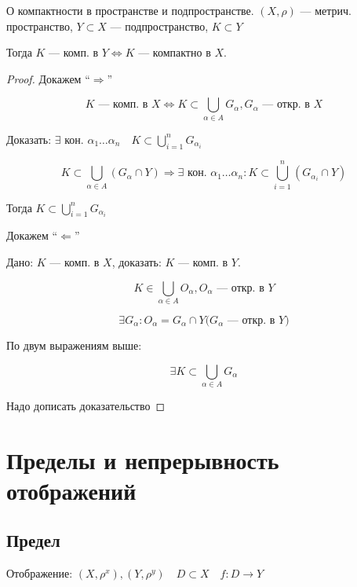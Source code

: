 \begin{theorem}
    О компактности в пространстве и подпространстве.
    $(X,\rho)$ --- метрич. пространство, $Y\subset X$ --- подпространство, $K\subset Y$

    Тогда $K$ --- комп. в $Y \Leftrightarrow K$ --- компактно в $X$.
\end{theorem}

\begin{proof}
    Докажем ``$\Rightarrow$''

    $$K\text{ --- комп. в }X \Leftrightarrow K\subset\bigcup\limits_{\alpha\in A} G_\alpha, G_\alpha\text{ --- откр. в } X$$

    Доказать: $\exists$ кон. $\alpha_1\ldots\alpha_n \quad K\subset\bigcup\limits_{i=1}^n G_{\alpha_i}$

    $$K\subset\bigcup\limits_{\alpha\in A}(G_\alpha\cap Y) \Rightarrow \exists\text{ кон. } \alpha_1\ldots\alpha_n: K\subset \bigcup\limits_{i=1}^n(G_{\alpha_i}\cap Y)$$

    Тогда $K\subset \bigcup\limits_{i=1}^n G_{\alpha_i}$

    Докажем ``$\Leftarrow$''

    Дано: $K$ --- комп. в $X$, доказать: $K$ --- комп. в $Y$.

    $$K\in\bigcup\limits_{\alpha\in A} O_\alpha, O_\alpha\text{ --- откр. в }Y$$

    $$\exists G_\alpha : O_\alpha=G_\alpha\cap Y\textit{($G_\alpha$ --- откр. в $Y$)}$$

    По двум выражениям выше:

    $$\exists K\subset \bigcup\limits_{\alpha\in A} G_\alpha$$


    Надо дописать доказательство
\end{proof}

\section{Пределы и непрерывность отображений}

\subsection{Предел}

Отображение: $(X, \rho^x), (Y, \rho^y) \quad D\subset X \quad f:D\to Y$

